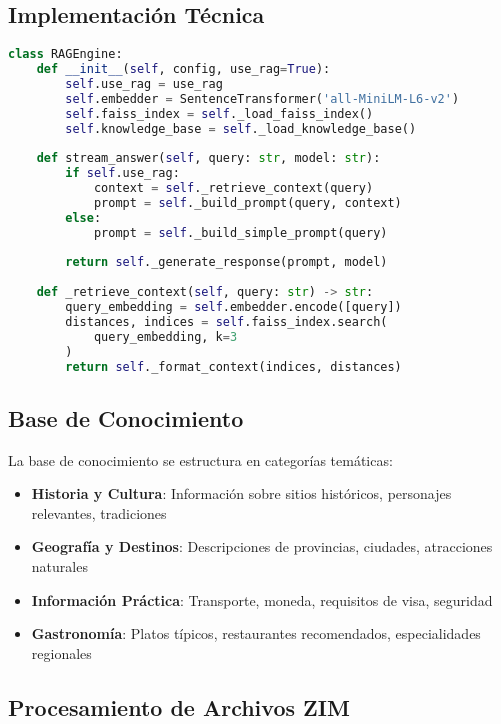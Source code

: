 \documentclass[runningheads]{llncs}
\begin{document}
\subsection{Implementación Técnica}

\begin{lstlisting}[language=Python, caption=Arquitectura del sistema RAG]
class RAGEngine:
    def __init__(self, config, use_rag=True):
        self.use_rag = use_rag
        self.embedder = SentenceTransformer('all-MiniLM-L6-v2')
        self.faiss_index = self._load_faiss_index()
        self.knowledge_base = self._load_knowledge_base()
        
    def stream_answer(self, query: str, model: str):
        if self.use_rag:
            context = self._retrieve_context(query)
            prompt = self._build_prompt(query, context)
        else:
            prompt = self._build_simple_prompt(query)
            
        return self._generate_response(prompt, model)
        
    def _retrieve_context(self, query: str) -> str:
        query_embedding = self.embedder.encode([query])
        distances, indices = self.faiss_index.search(
            query_embedding, k=3
        )
        return self._format_context(indices, distances)
\end{lstlisting}

\subsection{Base de Conocimiento}

La base de conocimiento se estructura en categorías temáticas:

\begin{itemize}
\item \textbf{Historia y Cultura}: Información sobre sitios históricos, personajes relevantes, tradiciones
\item \textbf{Geografía y Destinos}: Descripciones de provincias, ciudades, atracciones naturales
\item \textbf{Información Práctica}: Transporte, moneda, requisitos de visa, seguridad
\item \textbf{Gastronomía}: Platos típicos, restaurantes recomendados, especialidades regionales
\end{itemize}

\subsection{Procesamiento de Archivos ZIM}
\end{document}
